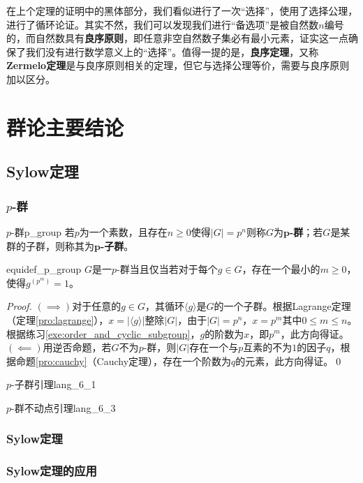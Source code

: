 \documentclass[../main.tex]{subfiles}
\begin{document}
\begin{remark}
在上个定理的证明中的黑体部分，我们看似进行了一次“选择”，使用了选择公理，进行了循环论证。其实不然，我们可以发现我们进行“备选项”是被自然数$n$编号的，而自然数具有\textbf{良序原则}，即任意非空自然数子集必有最小元素，证实这一点确保了我们没有进行数学意义上的“选择”。值得一提的是，\textbf{良序定理}，又称\textbf{Zermelo定理}是与良序原则相关的定理，但它与选择公理等价，需要与良序原则加以区分。
\end{remark}
\section{群论主要结论}
\subsection{Sylow定理}
\subsubsection{$p$-群}
\begin{definition}{$p$-群}{p_group}
若$p$为一个素数，且存在$n\geq0$使得$|G|=p^n$则称$G$为\textbf{$\mathbf{p}$-群}；若$G$是某群的子群，则称其为\textbf{$\mathbf{p}$-子群}。
\end{definition}
\begin{proposition}{}{equidef_p_group}
$G$是一$p$-群当且仅当若对于每个$g\in G$，存在一个最小的$m\geq0$，使得$g^{(p^m)}=1$。
\end{proposition}
\begin{proof}
$(\implies)$对于任意的$g\in G$，其循环$\langle g\rangle$是$G$的一个子群。根据Lagrange定理（定理\ref{pro:lagrange}），$x=|\langle g\rangle|$整除$|G|$，由于$|G|=p^n$，$x=p^m$其中$0\leq m\leq n$。根据练习\ref{exe:order_and_cyclic_subgroup}，$g$的阶数为$x$，即$p^m$，此方向得证。$(\impliedby)$用逆否命题，若$G$不为$p$-群，则$|G|$存在一个与$p$互素的不为$1$的因子$q$，根据命题\ref{pro:cauchy}（Cauchy定理），存在一个阶数为$q$的元素，此方向得证。\qed
\end{proof}
\begin{lemma}{$p$-子群引理}{lang_6_1}
\end{lemma}
\begin{lemma}{$p$-群不动点引理}{lang_6_3}
\end{lemma}
\subsubsection{Sylow定理}
\subsubsection{Sylow定理的应用}\label{subsub:sylow_theorems_applications}
\end{document}
